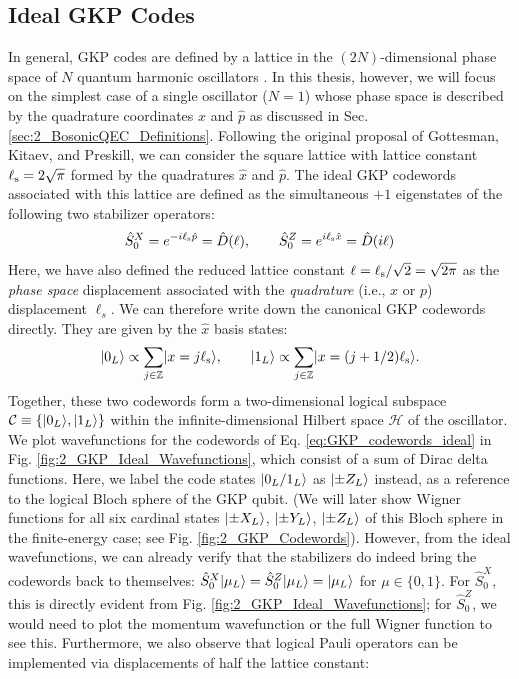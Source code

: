 \subsection{Ideal GKP Codes}
In general, GKP codes are defined by a lattice in the $(2N)$-dimensional phase space of $N$ quantum harmonic oscillators \cite{gottesman2001gkp, royer2022multimodegkp}. In this thesis, however, we will focus on the simplest case of a single oscillator ($N=1$) whose phase space is described by the quadrature coordinates $\hat{x}$ and $\hat{p}$ as discussed in Sec. \ref{sec:2_BosonicQEC_Definitions}. Following the original proposal of Gottesman, Kitaev, and Preskill, we can consider the square lattice with lattice constant $\ell_{\rm s} = 2\sqrt{\pi}$ formed by the quadratures $\hat{x}$ and $\hat{p}$. The ideal GKP codewords associated with this lattice are defined as the simultaneous $+1$ eigenstates of the following two stabilizer operators: 
\begin{equation}
    \hat{S}_0^X = e^{-i\ell_{\rm s}\hat{p}} = \hat{D}(\ell) , \qquad \hat{S}_0^Z = e^{i\ell_{\rm s}\hat{x}} = \hat{D}(i\ell)
\end{equation}
Here, we have also defined the reduced lattice constant $\ell = \ell_{\rm s}/\sqrt{2} = \sqrt{2\pi}$ as the \textit{phase space} displacement associated with the \textit{quadrature} (i.e., $x$ or $p$) displacement $\ell_s$. We can therefore write down the canonical GKP codewords directly. They are given by the $\hat{x}$ basis states:
\begin{equation}
    \lvert0_L\rangle \propto \sum_{j \in \mathbb{Z}} \lvert x = j\ell_{\rm s}\rangle, \qquad \lvert1_L\rangle \propto \sum_{j \in \mathbb{Z}} \lvert x = (j + 1/2)\ell_{\rm s}\rangle.
    \label{eq:GKP_codewords_ideal}
\end{equation}
Together, these two codewords form a two-dimensional logical subspace $\mathcal{C} \equiv \{\lvert0_L\rangle, \lvert1_L\rangle\}$ within the infinite-dimensional Hilbert space $\mathcal{H}$ of the oscillator. We plot wavefunctions for the codewords of Eq. \eqref{eq:GKP_codewords_ideal} in Fig. \ref{fig:2_GKP_Ideal_Wavefunctions}, which consist of a sum of Dirac delta functions. Here, we label the code states $\lvert0_L/1_L\rangle$ as $\lvert\pm Z_L\rangle$ instead, as a reference to the logical Bloch sphere of the GKP qubit. (We will later show Wigner functions for all six cardinal states $\lvert\pm X_L\rangle$, $\lvert\pm Y_L\rangle$, $\lvert\pm Z_L\rangle$ of this Bloch sphere in the finite-energy case; see Fig. \ref{fig:2_GKP_Codewords}). However, from the ideal wavefunctions, we can already verify that the stabilizers do indeed bring the codewords back to themselves: $\hat{S}_0^X\lvert\mu_L\rangle = \hat{S}_0^Z\lvert\mu_L\rangle = \lvert\mu_L\rangle$ for $\mu\in\{0, 1\}$. For $\hat{S}_0^X$, this is directly evident from Fig. \ref{fig:2_GKP_Ideal_Wavefunctions}; for $\hat{S}_0^Z$, we would need to plot the momentum wavefunction or the full Wigner function to see this. Furthermore, we also observe that logical Pauli operators can be implemented via displacements of half the lattice constant: 
